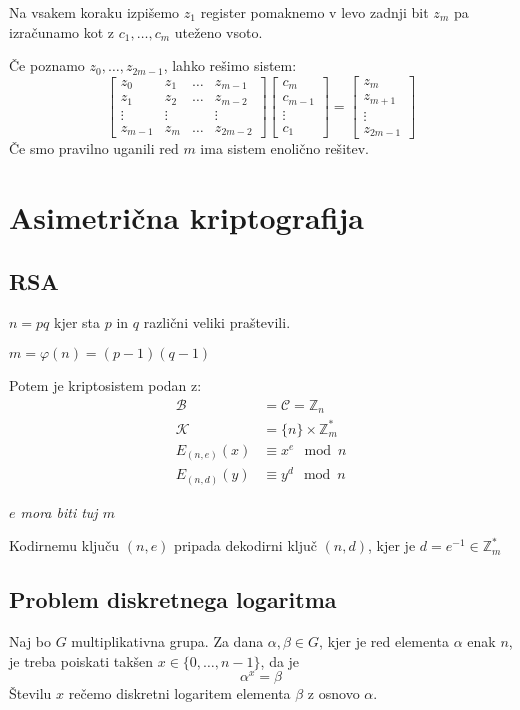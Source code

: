 \begin{multicols}{5}
Na vsakem koraku izpišemo $z_1$ register pomaknemo v levo zadnji bit $z_m$ pa 
izračunamo kot z $c_1, \dots, c_m$ uteženo vsoto.

Če poznamo $z_0, \dots, z_{2m-1}$, lahko rešimo sistem:
\[
\begin{bmatrix}
	z_0 & z_1 & \dots & z_{m-1} \\
	z_1 & z_2 & \dots & z_{m-2} \\
	\vdots & \vdots & & \vdots \\
	z_{m-1} & z_{m} & \dots & z_{2m-2} 
\end{bmatrix}
\begin{bmatrix}
	c_m \\
	c_{m-1} \\
	\vdots \\
	c_1
\end{bmatrix}
=
\begin{bmatrix}
	z_m \\
	z_{m+1} \\
	\vdots \\
	z_{2m-1}
\end{bmatrix}
\]
Če smo pravilno uganili red $m$ ima sistem enolično rešitev.

\section*{Asimetrična kriptografija}
\subsection*{RSA}
$n = pq$ kjer sta $p$ in $q$ različni veliki praštevili.

$m = \varphi(n) = (p-1)(q-1)$

Potem je kriptosistem podan z:
\begin{align*}
	\mathcal{B} &= \mathcal{C} = \mathbb{Z}_n \\
	\mathcal{K} &= \{n\} \times \mathbb{Z}_m^* \\
	E_{(n,e)}(x) &\equiv x^e \mod n \\
	E_{(n,d)}(y) &\equiv y^d \mod n
\end{align*}

\textit{$e$ mora biti tuj $m$}

Kodirnemu ključu $(n, e)$ pripada dekodirni ključ $(n, d)$, kjer je $d = e^{-1} \in \mathbb{Z}_m^*$

\subsection*{Problem diskretnega logaritma}
Naj bo $G$ multiplikativna grupa. Za dana $\alpha, \beta \in G$, kjer je red elementa $\alpha$ enak $n$, 
je treba poiskati takšen $x \in \{0, \dots, n-1\}$, da je
\[ \alpha^x = \beta\]
Številu $x$ rečemo diskretni logaritem elementa $\beta$ z osnovo $\alpha$.


\end{multicols}
